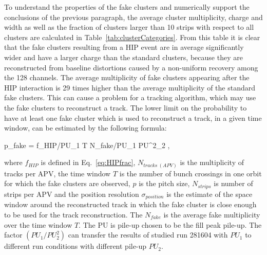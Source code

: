 To understand the properties of the fake clusters and numerically support the conclusions of the previous paragraph, the average cluster multiplicity, charge and width as well as the fraction of clusters larger than 10 strips with respect to all clusters are calculated in Table~\ref{tab:clusterCategories}. From this table it is clear that the fake clusters resulting from a HIP event are in average significantly wider and have a larger charge than the standard clusters, because they are reconstructed from baseline distortions caused by a non-uniform recovery among the 128 channels. The average multiplicity of fake clusters appearing after the HIP interaction is 29 times higher than the average multiplicity of the standard fake clusters. This can cause a problem for a tracking algorithm, which may use the fake clusters to reconstruct a track. The lower limit on the probability to have at least one fake cluster which is used to reconstruct a track, in a given time window, can be estimated by the following formula:


{
   p_{fake} = f_{HIP}/PU_{1} \times T  \times N_{fake}/PU_{1} \times PU^2_{2} \times  {}  ,
}

where $f_{HIP}$ is defined in Eq.~\ref{eq:HIPfrac}, $N_{tracks~(APV)}$ is the multiplicity of tracks per APV, the time window $T$ is the number of bunch crossings in one orbit for which the fake clusters are observed, $p$ is the pitch size, $N_{strips}$ is number of strips per APV and the position resolution $\sigma_{position}$ is the estimate of the space window around the reconstructed track in which the fake cluster is close enough to be used for the track reconstruction. The $N_{fake}$ is the average fake multiplicity over the time window $T$. The PU is pile-up chosen to be the fill peak pile-up. The factor $(PU_{1}/PU_{2}^2)$ can transfer the results of studied run 281604 with $PU_{1}$ to different run conditions with different pile-up $PU_{2}$.  

